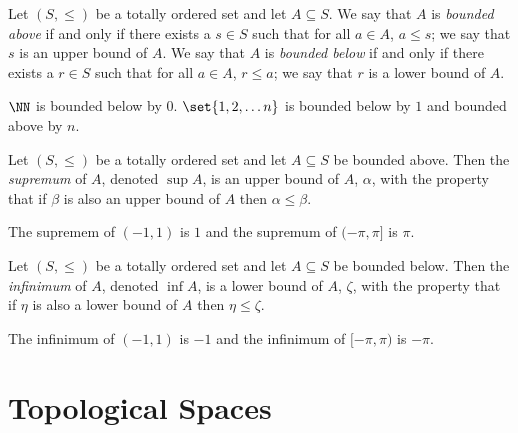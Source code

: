 \begin{definition*}
	Let $(S,\leq)$ be a totally ordered set and let $A\subseteq S$.
	We say that $A$ is \textit{bounded above} if and only if there exists a $s\in S$ such that for all $a\in A$, $a\leq s$; we say that $s$ is an upper bound of $A$.
	We say that $A$ is \textit{bounded below} if and only if there exists a $r\in S$ such that for all $a\in A$, $r\leq a$; we say that $r$ is a lower bound of $A$.
\end{definition*}
\begin{example*}
	$\NN$ is bounded below by $0$.
	$\set{1,2,\ldots n}$ is bounded below by $1$ and bounded above by $n$.
\end{example*}

\begin{definition*}
	Let $(S,\leq)$ be a totally ordered set and let $A\subseteq S$ be bounded above.
	Then the \textit{supremum} of $A$, denoted $\sup A$, is an upper bound of $A$, $\alpha$, with the property that if $\beta$ is also an upper bound of $A$ then $\alpha\leq\beta$.
\end{definition*}
\begin{example*}
	The supremem of $(-1,1)$ is $1$ and the supremum of $(-\pi, \pi]$ is $\pi$.
\end{example*}

\begin{definition*}
	Let $(S,\leq)$ be a totally ordered set and let $A\subseteq S$ be bounded below.
	Then the \textit{infinimum} of $A$, denoted $\inf A$, is a lower bound of $A$, $\zeta$, with the property that if $\eta$ is also a lower bound of $A$ then $\eta\leq\zeta$.
\end{definition*}
\begin{example*}
	The infinimum of $(-1,1)$ is $-1$ and the infinimum of $[-\pi, \pi)$ is $-\pi$.
\end{example*}


\pagebreak


\section*{Topological Spaces}


